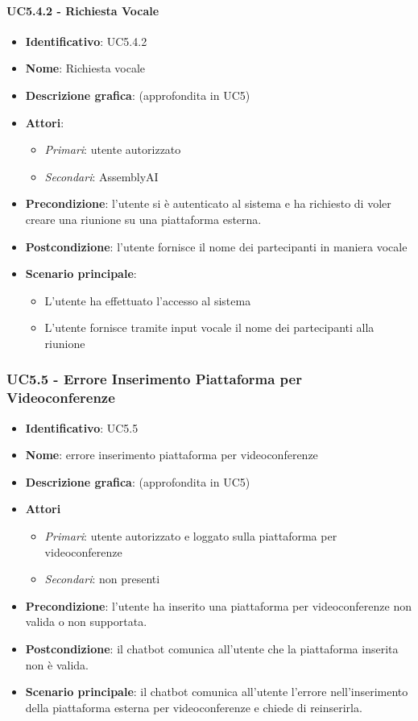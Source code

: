 \paragraph{UC5.4.2 - Richiesta Vocale}
\begin{itemize}
   \item \textbf{Identificativo}: UC5.4.2
   \item \textbf{Nome}: Richiesta vocale
   \item \textbf{Descrizione grafica}: (approfondita in UC5)
   \item \textbf{Attori}:
   \begin{itemize} 
       \item \textit{Primari}: utente autorizzato
       \item \textit{Secondari}: AssemblyAI
   \end{itemize}
       \item \textbf{Precondizione}: l'utente si è autenticato al sistema e ha richiesto di voler creare una riunione su una piattaforma esterna.
       \item \textbf{Postcondizione}: l'utente fornisce il nome dei partecipanti in maniera vocale
    \item \textbf{Scenario principale}: 
       \begin{itemize}
           \item L'utente ha effettuato l'accesso al sistema 
           \item L'utente fornisce tramite input vocale il nome dei partecipanti alla riunione
       \end{itemize}
\end{itemize}

\subsubsection{UC5.5 - Errore Inserimento Piattaforma per Videoconferenze}
\begin{itemize}
    \item \textbf{Identificativo}: UC5.5
    \item \textbf{Nome}: errore inserimento piattaforma per videoconferenze
    \item \textbf{Descrizione grafica}: (approfondita in UC5)
    \item \textbf{Attori}
 \begin{itemize} 
    \item \textit{Primari}: utente autorizzato e loggato sulla piattaforma per videoconferenze
    \item \textit{Secondari}: non presenti
 \end{itemize}
 \item \textbf{Precondizione}: l'utente ha inserito una piattaforma per videoconferenze non valida o non supportata.
 \item \textbf{Postcondizione}: il chatbot comunica all'utente che la piattaforma inserita non è valida.
 \item \textbf{Scenario principale}: il chatbot comunica all'utente l'errore nell'inserimento della piattaforma esterna per videoconferenze e chiede di reinserirla.
\end{itemize}
